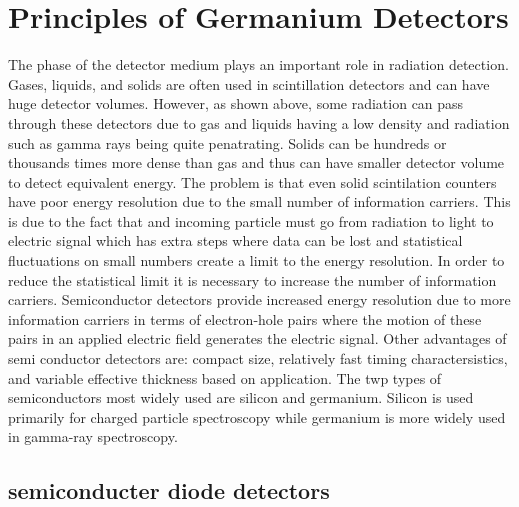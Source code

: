 \chapter{Principles of Germanium Detectors}
The phase of the detector medium plays an important role in radiation detection.
Gases, liquids, and solids are often used in scintillation detectors and can have huge detector volumes.
However, as shown above, some radiation can pass through these detectors due to gas and liquids having a low density and radiation such as gamma rays being quite penatrating.
Solids can be hundreds or thousands times more dense than gas and thus can have smaller detector volume to detect equivalent energy.
The problem is that even solid scintilation counters have poor energy resolution due to the small number of information carriers.
This is due to the fact that and incoming particle must go from radiation to light to electric signal which has extra steps where data can be lost and statistical fluctuations on small numbers create a limit to the energy resolution.
In order to reduce the statistical limit it is necessary to increase the number of information carriers.
Semiconductor detectors provide increased energy resolution due to more information carriers in terms of electron-hole pairs where the motion of these pairs in an applied electric field generates the electric signal.
Other advantages of semi conductor detectors are: compact size, relatively fast timing charactersistics, and variable effective thickness based on application.
The twp types of semiconductors most widely used are silicon and germanium.
Silicon is used primarily for charged particle spectroscopy while germanium is more widely used in gamma-ray spectroscopy.

\section{semiconducter diode detectors} 

